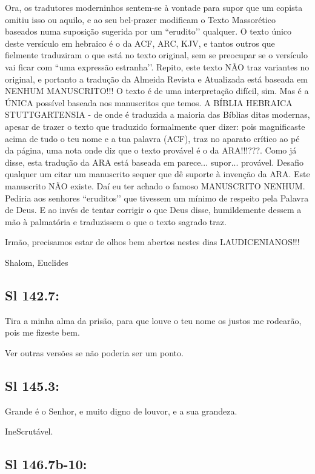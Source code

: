 Ora, os tradutores moderninhos sentem-se à vontade para supor que um copista omitiu isso ou aquilo, e ao seu bel-prazer modificam o Texto Massorético baseados numa suposição sugerida por um ``erudito’’ qualquer. O texto único deste versículo em hebraico é o da ACF, ARC, KJV, e tantos outros que fielmente traduziram o que está no texto original, sem se preocupar se o versículo vai ficar com ``uma expressão estranha’’. Repito, este texto NÃO traz variantes no original, e portanto a tradução da Almeida Revista e Atualizada está baseada em NENHUM MANUSCRITO!!! O texto é de uma interpretação difícil, sim. Mas é a ÚNICA possível baseada nos manuscritos que temos. A BÍBLIA HEBRAICA STUTTGARTENSIA - de onde é traduzida a maioria das Bíblias ditas modernas, apesar de trazer o texto que traduzido formalmente quer dizer: pois magnificaste acima de tudo o teu nome e a tua palavra (ACF), traz no aparato crítico ao pé da página, uma nota onde diz que o texto provável é o da ARA!!!???. Como já disse, esta tradução da ARA está baseada em parece... supor... provável. Desafio qualquer um citar um manuscrito sequer que dê suporte à invenção da ARA. Este manuscrito NÃO existe. Daí eu ter achado o famoso MANUSCRITO NENHUM. Pediria aos senhores ``eruditos’’ que tivessem um mínimo de respeito pela Palavra de Deus. E ao invés de tentar corrigir o que Deus disse, humildemente dessem a mão à palmatória e traduzissem o que o texto sagrado traz.

Irmão, precisamos estar de olhos bem abertos nestes dias LAUDICENIANOS!!!

Shalom, Euclides

\subsection{Sl 142.7:}

 Tira a minha alma da prisão, para que louve o teu nome\uwave{;} os justos me rodearão, pois me fizeste bem.

Ver outras versões se não poderia ser um ponto.

\subsection{Sl 145.3:}

 Grande é o Senhor, e muito digno de louvor, e a sua grandeza.

IneScrutável.

\subsection{Sl 146.7b-10:}

